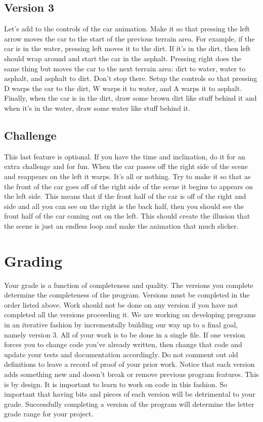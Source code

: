 \documentclass[10pt]{article}
\begin{document}
\subsection*{Version 3}

Let's add to the controls of the car animation.  Make it so that pressing the left arrow moves the car to the start of the previous terrain area. For example, if the car is in the water, pressing left moves it to the dirt. If it's in the dirt, then left should wrap around and start the car in the asphalt. Pressing right does the same thing but moves the car to the next terrain area: dirt to water, water to asphalt, and asphalt to dirt. Don't stop there. Setup the controls so that pressing D warps the car to the dirt, W warps it to water, and A warps it to asphalt. Finally, when the car is in the dirt, draw some brown dirt like stuff behind it and when it's in the water, draw some water like stuff behind it.

\subsection*{Challenge}

This last feature is optional. If you have the time and inclination, do it for an extra challenge and for fun. When the car passes off the right side of the scene and reappears on the left it warps. It's all or nothing. Try to make it so that as the front of the car goes off of the right side of the scene it begins to appears on the left side. This means that if the front half of the car is off of the right and side and all you can see on the right is the back half, then you should see the front half of the car coming out on the left. This should create the illusion that the scene is just an endless loop and make the animation that much slicker.


\section*{Grading}

Your grade is a function of completeness and quality. The versions you complete determine the completeness of the program. Versions must be completed in the order listed above. Work should not be done on any version if you have not completed all the versions proceeding it. We are working on developing programs in an iterative fashion by incrementally building our way up to a final goal, namely version 3. All of your work is to be done in a single file. If one version forces you to change code you've already written, then change that code and update your tests and documentation accordingly. Do not comment out old definitions to leave a record of proof of your prior work. Notice that each version adds something new and doesn't break or remove previous program features. This is by design. It is important to learn to work on code in this fashion. So important that having bits and pieces of each version will be detrimental to your grade. Successfully completing a version of the program will determine the letter grade range for your project.
\end{document}
